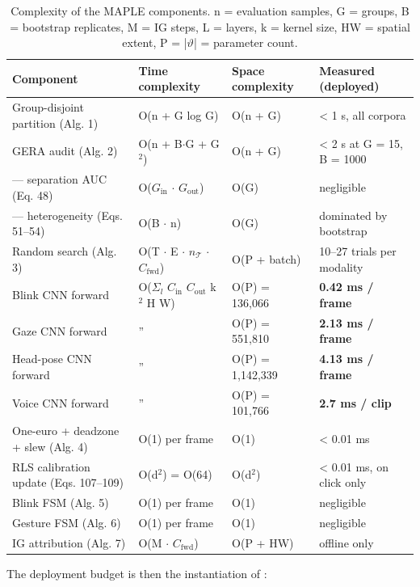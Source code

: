 \begin{table}[pos=htbp]
\centering
\caption{Complexity of the MAPLE components. n = evaluation samples, G = groups, B = bootstrap replicates, M = IG steps, L = layers, k = kernel size, HW = spatial extent, P = |$\vartheta$| = parameter count.}
\label{tab:7}
\footnotesize
\begin{tabularx}{\textwidth}{XXXX}
\toprule
\textbf{Component} & \textbf{Time complexity} & \textbf{Space complexity} & \textbf{Measured (deployed)} \\
\midrule
Group-disjoint partition (Alg. 1) & O(n + G log G) & O(n + G) & < 1 s, all corpora \\
GERA audit (Alg. 2) & O(n + B$\cdot$G + G$^{2}$) & O(n + G) & < 2 s at G = 15, B = 1000 \\
--- separation AUC (Eq. 48) & O($G_{\mathrm{in}}$ $\cdot$ $G_{\mathrm{out}}$) & O(G) & negligible \\
--- heterogeneity (Eqs. 51--54) & O(B $\cdot$ n) & O(G) & dominated by bootstrap \\
Random search (Alg. 3) & O(T $\cdot$ E $\cdot$ $n_{\mathcal{T}}$ $\cdot$ $C_{\mathrm{fwd}}$) & O(P + batch) & 10--27 trials per modality \\
Blink CNN forward & O($\Sigma_{l}$ $C_{\mathrm{in}}$ $C_{\mathrm{out}}$ k$^{2}$ H W) & O(P) = 136,066 & \textbf{0.42 ms / frame} \\
Gaze CNN forward & '' & O(P) = 551,810 & \textbf{2.13 ms / frame} \\
Head-pose CNN forward & '' & O(P) = 1,142,339 & \textbf{4.13 ms / frame} \\
Voice CNN forward & '' & O(P) = 101,766 & \textbf{2.7 ms / clip} \\
One-euro + deadzone + slew (Alg. 4) & O(1) per frame & O(1) & < 0.01 ms \\
RLS calibration update (Eqs. 107--109) & O(d$^{2}$) = O(64) & O(d$^{2}$) & < 0.01 ms, on click only \\
Blink FSM (Alg. 5) & O(1) per frame & O(1) & negligible \\
Gesture FSM (Alg. 6) & O(1) per frame & O(1) & negligible \\
IG attribution (Alg. 7) & O(M $\cdot$ $C_{\mathrm{fwd}}$) & O(P + HW) & offline only \\
\bottomrule
\end{tabularx}
\end{table}

The deployment budget is then the instantiation of :


